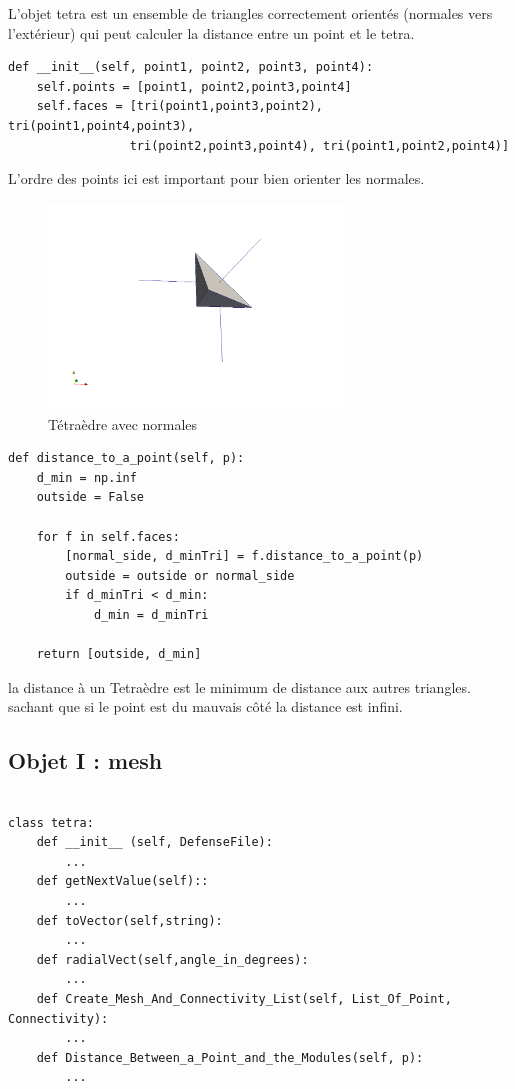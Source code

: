 \documentclass[french]{article}
\begin{document}
L'objet tetra est un ensemble de triangles correctement orientés (normales vers l'extérieur) qui peut
calculer la distance entre un point et le tetra.
\begin{verbatim}
def __init__(self, point1, point2, point3, point4):
	self.points = [point1, point2,point3,point4]
	self.faces = [tri(point1,point3,point2), tri(point1,point4,point3),
				 tri(point2,point3,point4), tri(point1,point2,point4)]
\end{verbatim}
L'ordre des points ici est important pour bien orienter les normales.
\begin{figure}[h]
	\centering
	\includegraphics[width=0.7\textwidth]{Figures/TetraNormals.png}
	\caption{Tétraèdre avec normales}
\end{figure}

\begin{verbatim}
def distance_to_a_point(self, p):
	d_min = np.inf 
	outside = False
	
	for f in self.faces:
		[normal_side, d_minTri] = f.distance_to_a_point(p)
		outside = outside or normal_side
		if d_minTri < d_min:
			d_min = d_minTri
	
	return [outside, d_min] 
\end{verbatim}
la distance à un Tetraèdre est le minimum de distance aux autres triangles. sachant que si le point
est du mauvais côté la distance est infini.

\subsection{Objet I : mesh}
\vspace{10pt}
\begin{verbatim}

class tetra:
	def __init__ (self, DefenseFile):
		...
	def getNextValue(self)::
		...
	def toVector(self,string):
		...
	def radialVect(self,angle_in_degrees):
		...
	def Create_Mesh_And_Connectivity_List(self, List_Of_Point, Connectivity):
		...
	def Distance_Between_a_Point_and_the_Modules(self, p):
		...

\end{verbatim}
\end{document}
